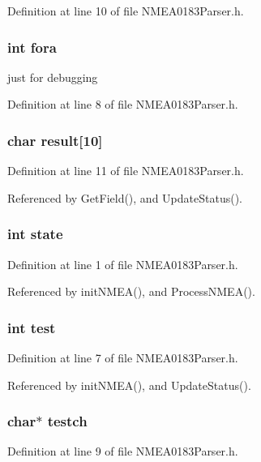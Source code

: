 Definition at line 10 of file NMEA0183Parser.h.
\subsubsection{\setlength{\rightskip}{0pt plus 5cm}int {\bf fora}}\label{_n_m_e_a0183_parser_8h_d3dba34925cf98a5428b085177bc483e}


just for debugging 



Definition at line 8 of file NMEA0183Parser.h.
\subsubsection{\setlength{\rightskip}{0pt plus 5cm}char {\bf result}[10]}\label{_n_m_e_a0183_parser_8h_64cc34a5fb671e0f67789b2791cc5207}




Definition at line 11 of file NMEA0183Parser.h.

Referenced by GetField(), and UpdateStatus().
\subsubsection{\setlength{\rightskip}{0pt plus 5cm}int {\bf state}}\label{_n_m_e_a0183_parser_8h_89f234133d3efe315836311cbf21c64b}




Definition at line 1 of file NMEA0183Parser.h.

Referenced by initNMEA(), and ProcessNMEA().
\subsubsection{\setlength{\rightskip}{0pt plus 5cm}int {\bf test}}\label{_n_m_e_a0183_parser_8h_1bd3f5fbccb1628eb13dda4cd02633a4}




Definition at line 7 of file NMEA0183Parser.h.

Referenced by initNMEA(), and UpdateStatus().
\subsubsection{\setlength{\rightskip}{0pt plus 5cm}char$\ast$ {\bf testch}}\label{_n_m_e_a0183_parser_8h_3fa4218059e3733267dbd4fd04863897}




Definition at line 9 of file NMEA0183Parser.h.